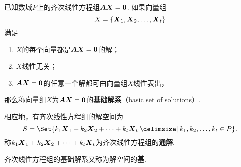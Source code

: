\begin{definition}
已知数域\(P\)上的齐次线性方程组\(\boldsymbol{A}\boldsymbol{X}=\boldsymbol{0}\).
如果向量组\[
X=\{\boldsymbol{X}_1,\boldsymbol{X}_2,\dotsc,\boldsymbol{X}_t\}
\]满足
\begin{enumerate}
\item \(X\)的每个向量都是\(\boldsymbol{A}\boldsymbol{X}=\boldsymbol{0}\)的解；
\item \(X\)线性无关；
\item \(\boldsymbol{A}\boldsymbol{X}=\boldsymbol{0}\)的任意一个解都可由向量组\(X\)线性表出，%
\end{enumerate}
那么称向量组\(X\)为\(\boldsymbol{A}\boldsymbol{X}=\boldsymbol{0}\)的\textbf{基础解系}（basic set of solutions）.

\def\tongjie{ k_1\mat{X}_1+k_2\mat{X}_2+ \dotsb +k_t\mat{X}_t }
相应地，有齐次线性方程组的解空间为\[
S = \Set{ \tongjie \given k_1,k_2,\dotsc,k_t \in P }.
\]称\(\tongjie\)为齐次线性方程组的\textbf{通解}.

齐次线性方程组的基础解系又称为解空间的\textbf{基}.
\end{definition}


